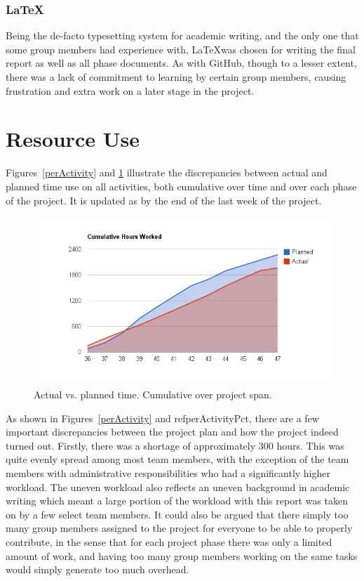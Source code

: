 \subsubsection{\LaTeX}
Being the de-facto typesetting system for academic writing, and the
only one that some group members had experience with, \LaTeX was
chosen for writing the final report as well as all phase documents. As
with GitHub, though to a lesser extent,  there was a lack of commitment to learning by certain
group members, causing frustration and extra work on a later stage
in the project.


\section{Resource Use}\label{resourceUse}

Figures~\ref{perActivity} and \ref{actualPlannedCuml} illustrate
the discrepancies between actual and planned time use on all
activities, both cumulative over time and over each phase of the
project. It is updated as by the end of the last week of the project.

\begin{centering}
  \begin{figure}[h!]
    \includegraphics[width = \textwidth]{Evaluation/actual_v_planned_cuml}
    \caption{Actual vs. planned time. Cumulative over project span.}
    \label{actualPlannedCuml}
  \end{figure}
\end{centering}

As shown in Figures~\ref{perActivity} and ref{perActivityPct}, there
are a few important discrepancies between the project plan and how the
project indeed turned out. Firstly, there was a shortage of
approximately 300 hours. This was quite evenly spread among most team
members, with the exception of the team members with administrative
responsibilities who had a significantly higher workload. The uneven
workload also reflects an uneven background in academic writing which
meant a large portion of the workload with this report was taken on by
a few select team members. It could also be argued that there simply
too many group members assigned to the project for everyone to be able
to properly contribute, in the sense that for each project phase there
was only a limited amount of work, and having too many group members
working on the same tasks would simply generate too much overhead.

